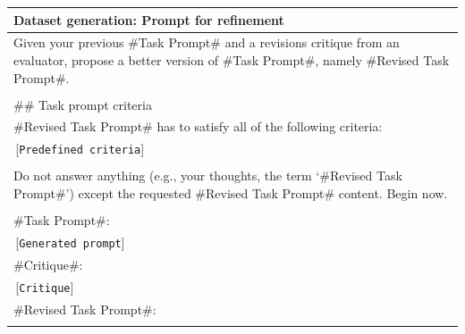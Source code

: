 \documentclass[11pt]{article}
\begin{document}
\begin{table}[htbp]
{\begin{tabular}{l}
    \hline
    \hline
    \textbf{Dataset generation: Prompt for refinement} \\
    \hline
        \multicolumn{1}{p{\columnwidth}}{\strut Given your previous \#Task Prompt\# and a revisions critique from an evaluator, propose a better version of \#Task Prompt\#, namely \#Revised Task Prompt\#.} \\
        \\
        \#\# Task prompt criteria \\
        \#Revised Task Prompt\# has to satisfy all of the following criteria: \\
        \,[\verb|Predefined criteria|] \\
        \\
        \multicolumn{1}{p{\columnwidth}}{\strut Do not answer anything (e.g., your thoughts, the term ‘\#Revised Task Prompt\#’) except the requested \#Revised Task Prompt\# content. \newline
        Begin now.} \\
        \\
        \#Task Prompt\#: \\
        \,[\verb|Generated prompt|] \\
        \#Critique\#: \\
        \,[\verb|Critique|] \\
        \#Revised Task Prompt\#: \\
    \Xhline{3\arrayrulewidth}
    \end{tabular}
}
\end{table}
\end{document}
